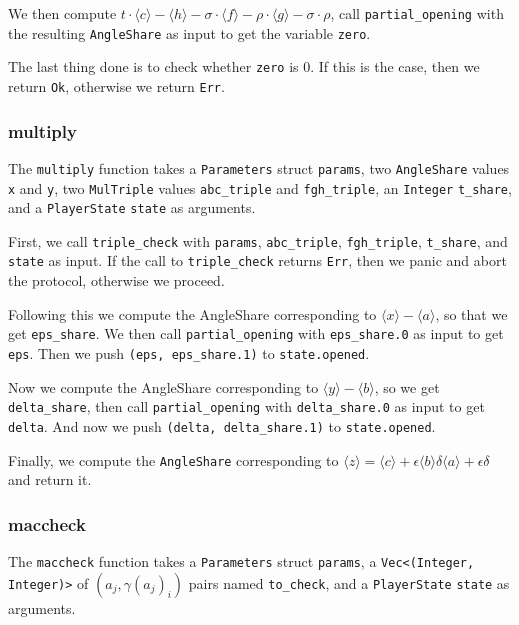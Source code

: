 \documentclass[../main.tex]{subfiles}
\begin{document}
We then compute $t \cdot \langle c \rangle - \langle h \rangle - \sigma \cdot \langle f \rangle - \rho \cdot \langle g \rangle - \sigma \cdot \rho$, call \lstinline{partial_opening} with the resulting \lstinline{AngleShare} as input to get the variable \lstinline{zero}.

The last thing done is to check whether \lstinline{zero} is $0$. If this is the case, then we return \lstinline{Ok}, otherwise we return \lstinline{Err}.

\subsubsection{multiply}
The \lstinline{multiply} function takes a \lstinline{Parameters} struct \lstinline{params}, two \lstinline{AngleShare} values \lstinline{x} and \lstinline{y}, two \lstinline{MulTriple} values \lstinline{abc_triple} and \lstinline{fgh_triple}, an \lstinline{Integer} \lstinline{t_share}, and a \lstinline{PlayerState} \lstinline{state} as arguments.

First, we call \lstinline{triple_check} with \lstinline{params}, \lstinline{abc_triple}, \lstinline{fgh_triple}, \lstinline{t_share}, and \lstinline{state} as input. If the call to \lstinline{triple_check} returns \lstinline{Err}, then we panic and abort the protocol, otherwise we proceed.

Following this we compute the AngleShare corresponding to $\langle x \rangle - \langle a \rangle$, so that we get \lstinline{eps_share}. We then call \lstinline{partial_opening} with \lstinline{eps_share.0} as input to get \lstinline{eps}. Then we push \lstinline{(eps, eps_share.1)} to \lstinline{state.opened}.

Now we compute the AngleShare corresponding to $\langle y \rangle - \langle b \rangle$, so we get \lstinline{delta_share}, then call \lstinline{partial_opening} with \lstinline{delta_share.0} as input to get \lstinline{delta}. And now we push \lstinline{(delta, delta_share.1)} to \lstinline{state.opened}.

Finally, we compute the \lstinline{AngleShare} corresponding to $\langle z \rangle = \langle c \rangle + \epsilon \langle b \rangle \delta \langle a \rangle + \epsilon \delta$ and return it.
\subsubsection{maccheck}
The \lstinline{maccheck} function takes a \lstinline{Parameters} struct \lstinline{params}, a \lstinline{Vec<(Integer, Integer)>} of $(a_j, \gamma(a_j)_i)$ pairs named \lstinline{to_check}, and a \lstinline{PlayerState} \lstinline{state} as arguments.
\end{document}
